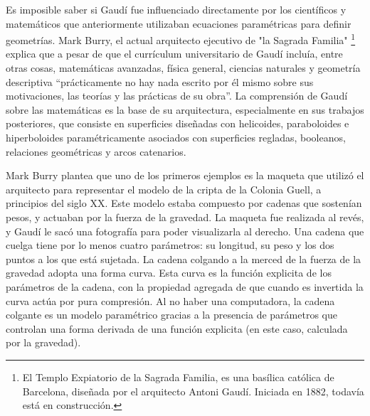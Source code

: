 Es imposible saber si Gaudí fue influenciado directamente por los científicos y matemáticos que anteriormente utilizaban ecuaciones paramétricas para definir geometrías. 
Mark Burry, el actual arquitecto ejecutivo de "la Sagrada Familia" \footnote{El Templo Expiatorio de la Sagrada Familia, es una basílica católica de Barcelona, diseñada por el arquitecto Antoni Gaudí. Iniciada en 1882, todavía está en construcción.} explica que a pesar de que el currículum universitario de Gaudí incluía, entre otras cosas, matemáticas avanzadas, física general, ciencias naturales y geometría descriptiva ``prácticamente no hay nada escrito por él mismo sobre sus motivaciones, las teorías y las prácticas de su obra''. La comprensión de Gaudí sobre las matemáticas es la base de su arquitectura, especialmente en sus trabajos posteriores, que consiste en superficies diseñadas con helicoides, paraboloides e hiperboloides paramétricamente asociados con superficies regladas, booleanos, relaciones geométricas y arcos catenarios. \cite{Davis2013}

Mark Burry plantea que uno de los primeros ejemplos es la maqueta que utilizó el arquitecto para representar el modelo de la cripta de la Colonia Guell, a principios del siglo XX. Este modelo estaba compuesto por cadenas que sostenían pesos, y actuaban por la fuerza de la gravedad.
La maqueta fue realizada al revés, y Gaudí le sacó una fotografía para poder visualizarla al derecho. Una cadena que cuelga tiene por lo menos cuatro parámetros: su longitud, su peso y los dos puntos a los que está sujetada. La cadena colgando a la merced de la fuerza de la gravedad adopta una forma curva. Esta curva es la función explicita de los parámetros de la cadena, con la propiedad agregada de que cuando es invertida la curva actúa por pura compresión. Al no haber una computadora, la cadena colgante es un modelo paramétrico gracias a la presencia de parámetros que controlan una forma derivada de una función explicita (en este caso, calculada por la gravedad). \cite{Kaled2016}



